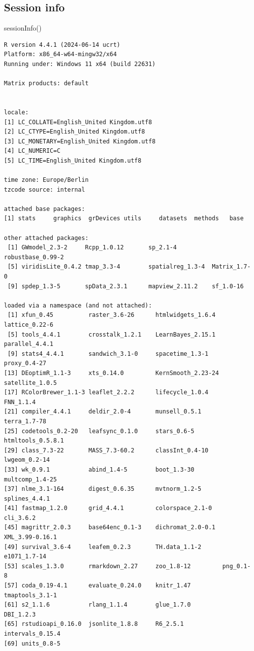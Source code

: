 \documentclass[
  letterpaper,
  DIV=11,
  numbers=noendperiod]{scrreprt}
\newenvironment{Shaded}{\begin{snugshade}}{\end{snugshade}}
\newcommand{\FunctionTok}[1]{\textcolor[rgb]{0.28,0.35,0.67}{#1}}
\newcommand{\NormalTok}[1]{\textcolor[rgb]{0.00,0.23,0.31}{#1}}
\begin{document}
\hypertarget{session-info-12}{%
\subsection{Session info}\label{session-info-12}}

\begin{Shaded}
\begin{Highlighting}[]
\FunctionTok{sessionInfo}\NormalTok{()}
\end{Highlighting}
\end{Shaded}

\begin{verbatim}
R version 4.4.1 (2024-06-14 ucrt)
Platform: x86_64-w64-mingw32/x64
Running under: Windows 11 x64 (build 22631)

Matrix products: default


locale:
[1] LC_COLLATE=English_United Kingdom.utf8 
[2] LC_CTYPE=English_United Kingdom.utf8   
[3] LC_MONETARY=English_United Kingdom.utf8
[4] LC_NUMERIC=C                           
[5] LC_TIME=English_United Kingdom.utf8    

time zone: Europe/Berlin
tzcode source: internal

attached base packages:
[1] stats     graphics  grDevices utils     datasets  methods   base     

other attached packages:
 [1] GWmodel_2.3-2     Rcpp_1.0.12       sp_2.1-4          robustbase_0.99-2
 [5] viridisLite_0.4.2 tmap_3.3-4        spatialreg_1.3-4  Matrix_1.7-0     
 [9] spdep_1.3-5       spData_2.3.1      mapview_2.11.2    sf_1.0-16        

loaded via a namespace (and not attached):
 [1] xfun_0.45          raster_3.6-26      htmlwidgets_1.6.4  lattice_0.22-6    
 [5] tools_4.4.1        crosstalk_1.2.1    LearnBayes_2.15.1  parallel_4.4.1    
 [9] stats4_4.4.1       sandwich_3.1-0     spacetime_1.3-1    proxy_0.4-27      
[13] DEoptimR_1.1-3     xts_0.14.0         KernSmooth_2.23-24 satellite_1.0.5   
[17] RColorBrewer_1.1-3 leaflet_2.2.2      lifecycle_1.0.4    FNN_1.1.4         
[21] compiler_4.4.1     deldir_2.0-4       munsell_0.5.1      terra_1.7-78      
[25] codetools_0.2-20   leafsync_0.1.0     stars_0.6-5        htmltools_0.5.8.1 
[29] class_7.3-22       MASS_7.3-60.2      classInt_0.4-10    lwgeom_0.2-14     
[33] wk_0.9.1           abind_1.4-5        boot_1.3-30        multcomp_1.4-25   
[37] nlme_3.1-164       digest_0.6.35      mvtnorm_1.2-5      splines_4.4.1     
[41] fastmap_1.2.0      grid_4.4.1         colorspace_2.1-0   cli_3.6.2         
[45] magrittr_2.0.3     base64enc_0.1-3    dichromat_2.0-0.1  XML_3.99-0.16.1   
[49] survival_3.6-4     leafem_0.2.3       TH.data_1.1-2      e1071_1.7-14      
[53] scales_1.3.0       rmarkdown_2.27     zoo_1.8-12         png_0.1-8         
[57] coda_0.19-4.1      evaluate_0.24.0    knitr_1.47         tmaptools_3.1-1   
[61] s2_1.1.6           rlang_1.1.4        glue_1.7.0         DBI_1.2.3         
[65] rstudioapi_0.16.0  jsonlite_1.8.8     R6_2.5.1           intervals_0.15.4  
[69] units_0.8-5       
\end{verbatim}
\end{document}
